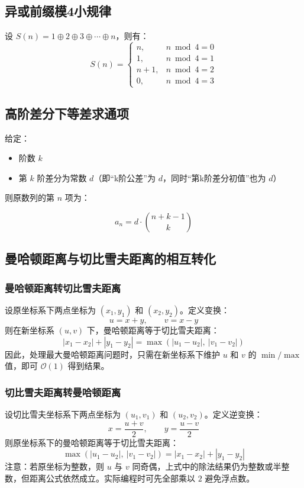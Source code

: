 \documentclass[11pt,a4paper,twocolumn]{ctexart}  %
\begin{document}


\subsection{异或前缀模4小规律}

设 $S(n) = 1 \oplus 2 \oplus 3 \oplus \cdots \oplus n$，则有：
\[
S(n) =
\begin{cases}
n,      & n \bmod 4 = 0 \\
1,      & n \bmod 4 = 1 \\
n+1,    & n \bmod 4 = 2 \\
0,      & n \bmod 4 = 3
\end{cases}
\]

\subsection{高阶差分下等差求通项}
给定：
\begin{itemize}
\item 阶数 $k$
\item 第 $k$ 阶差分为常数 $d$（即“k阶公差”为 $d$，同时“第k阶差分初值”也为 $d$）
\end{itemize}
则原数列的第 $n$ 项为：

\[
\boxed{
a_n = d \cdot \binom{n+k-1}{k}
}
\]



\subsection{曼哈顿距离与切比雪夫距离的相互转化}

\subsubsection*{曼哈顿距离转切比雪夫距离}
设原坐标系下两点坐标为 $(x_1, y_1)$ 和 $(x_2, y_2)$。定义变换：
\[
u = x + y,\qquad v = x - y
\]
则在新坐标系 $(u, v)$ 下，曼哈顿距离等于切比雪夫距离：
\[
|x_1 - x_2| + |y_1 - y_2| = \max(|u_1 - u_2|,\ |v_1 - v_2|)
\]
因此，处理最大曼哈顿距离问题时，只需在新坐标系下维护 $u$ 和 $v$ 的 $\min/\max$ 值，即可 $\mathcal{O}(1)$ 得到结果。

\subsubsection*{切比雪夫距离转曼哈顿距离}
设切比雪夫坐标系下两点坐标为 $(u_1, v_1)$ 和 $(u_2, v_2)$。定义逆变换：
\[
x = \frac{u + v}{2},\qquad y = \frac{u - v}{2}
\]
则原坐标系下的曼哈顿距离等于切比雪夫距离：
\[
\max(|u_1 - u_2|,\ |v_1 - v_2|) = |x_1 - x_2| + |y_1 - y_2|
\]
注意：若原坐标为整数，则 $u$ 与 $v$ 同奇偶，上式中的除法结果仍为整数或半整数，但距离公式依然成立。实际编程时可先全部乘以 $2$ 避免浮点数。
\end{document}
